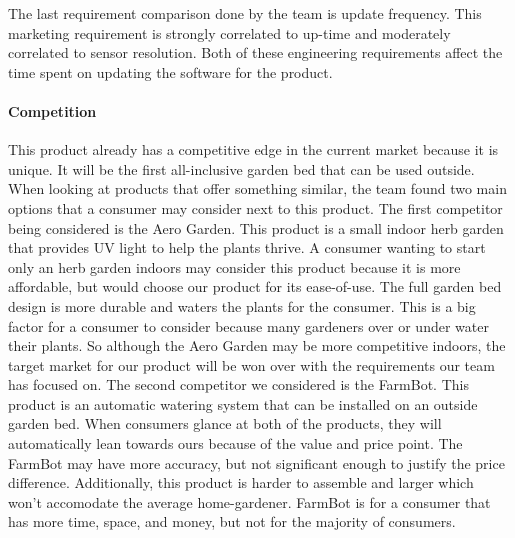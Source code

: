 The last requirement comparison done by the team is update frequency. This marketing requirement is strongly correlated to up-time and moderately correlated to sensor resolution. Both of these engineering requirements affect the time spent on updating the software for the product. \\

\paragraph{Competition}
This product already has a competitive edge in the current market because it is unique. It will be the first all-inclusive garden bed that can be used outside. When looking at products that offer something similar, the team found two main options that a consumer may consider next to this product. The first competitor being considered is the Aero Garden. This product is a small indoor herb garden that provides UV light to help the plants thrive. A consumer wanting to start only an herb garden indoors may consider this product because it is more affordable, but would choose our product for its ease-of-use. The full garden bed design is more durable and waters the plants for the consumer. This is a big factor for a consumer to consider because many gardeners over or under water their plants. So although the Aero Garden may be more competitive indoors, the target market for our product will be won over with the requirements our team has focused on. The second competitor we considered is the FarmBot. This product is an automatic watering system that can be installed on an outside garden bed. When consumers glance at both of the products, they will automatically lean towards ours because of the value and price point. The FarmBot may have more accuracy, but not significant enough to justify the price difference. Additionally, this product is harder to assemble and larger which won't accomodate the average home-gardener. FarmBot is for a consumer that has more time, space, and money, but not for the majority of consumers.